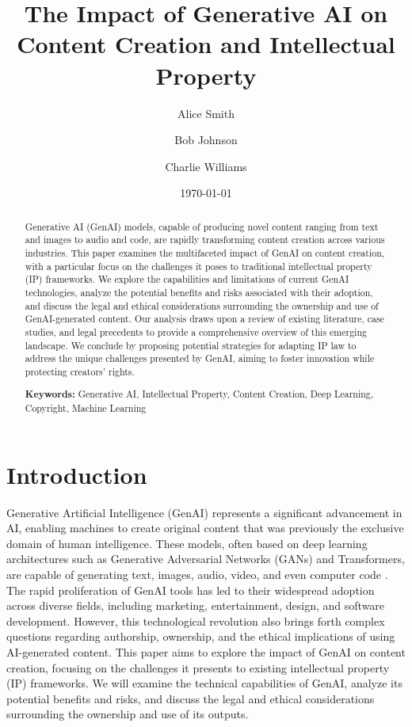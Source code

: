 \documentclass[12pt,a4paper]{article}
\title{The Impact of Generative AI on Content Creation and Intellectual Property}
\author{Alice Smith \and Bob Johnson \and Charlie Williams}
\date{\today}
\begin{document}
\maketitle
\thispagestyle{empty}

\begin{abstract}
Generative AI (GenAI) models, capable of producing novel content ranging from text and images to audio and code, are rapidly transforming content creation across various industries. This paper examines the multifaceted impact of GenAI on content creation, with a particular focus on the challenges it poses to traditional intellectual property (IP) frameworks. We explore the capabilities and limitations of current GenAI technologies, analyze the potential benefits and risks associated with their adoption, and discuss the legal and ethical considerations surrounding the ownership and use of GenAI-generated content. Our analysis draws upon a review of existing literature, case studies, and legal precedents to provide a comprehensive overview of this emerging landscape. We conclude by proposing potential strategies for adapting IP law to address the unique challenges presented by GenAI, aiming to foster innovation while protecting creators' rights.

\textbf{Keywords:} Generative AI, Intellectual Property, Content Creation, Deep Learning, Copyright, Machine Learning
\end{abstract}

\newpage
\tableofcontents
\newpage

\section{Introduction}
Generative Artificial Intelligence (GenAI) represents a significant advancement in AI, enabling machines to create original content that was previously the exclusive domain of human intelligence. These models, often based on deep learning architectures such as Generative Adversarial Networks (GANs) and Transformers, are capable of generating text, images, audio, video, and even computer code \citep{goodfellow2014generative, vaswani2017attention}. The rapid proliferation of GenAI tools has led to their widespread adoption across diverse fields, including marketing, entertainment, design, and software development. However, this technological revolution also brings forth complex questions regarding authorship, ownership, and the ethical implications of using AI-generated content. This paper aims to explore the impact of GenAI on content creation, focusing on the challenges it presents to existing intellectual property (IP) frameworks. We will examine the technical capabilities of GenAI, analyze its potential benefits and risks, and discuss the legal and ethical considerations surrounding the ownership and use of its outputs.
\end{document}
